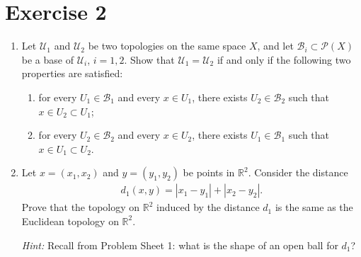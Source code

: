 \documentclass[12pt]{article}
\begin{document}
\section*{Exercise 2}
\begin{enumerate}
\item[i)] Let $\mathcal{U}_1$ and $\mathcal{U}_2$ be two topologies on the same space $X$, and let $\mathcal{B}_i\subset\mathcal{P}(X)$ be a base of $\mathcal{U}_i$, $i=1,2$. Show that $\mathcal{U}_1=\mathcal{U}_2$ if and only if the following two properties are satisfied:
\begin{enumerate}
\item[a)] for every $U_1\in\mathcal{B}_1$ and every $x\in U_1$, there exists $U_2\in\mathcal{B}_2$ such that $x\in U_2\subset U_1$;
\item[b)] for every $U_2\in\mathcal{B}_2$ and every $x\in U_2$, there exists $U_1\in\mathcal{B}_1$ such that $x\in U_1\subset U_2$.
\end{enumerate}
\item[ii)] Let $x=(x_1,x_2)$ and $y=(y_1,y_2)$ be points in $\mathbb{R}^2$. Consider the distance
\begin{align*}
d_1(x,y)=|x_1-y_1|+|x_2-y_2|.
\end{align*}
Prove that the topology on $\mathbb{R}^2$ induced by the distance $d_1$ is the same as the Euclidean topology on $\mathbb{R}^2$.

\textit{Hint:} Recall from Problem Sheet 1: what is the shape of an open ball for $d_1$?
\end{enumerate}
\end{document}

